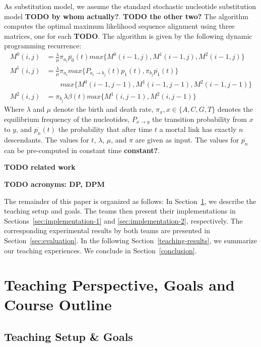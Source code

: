 \documentclass[runningheads,a4paper]{llncs}
\begin{document}
As substitution model, we assume the standard stochastic nucleotide substitution model {\bf TODO by whom actually?}. 
{\bf TODO the other two?} 
The algorithm computes the optimal maximum likelihood sequence alignment using three matrices, one for each {\bf TODO}.
The algorithm is given by the following dynamic programming recurrence: 
\[
\begin{aligned}
  M^0(i,j)&=\frac{\lambda}{\mu}\pi_{a_i}\overline{p_0}(t)max\{M^0(i-1, j), M^1(i-1,j), M^2(i-1,j)\}\\
  M^1(i,j)&=\frac{\lambda}{\mu}\pi_{a_i}max\{P_{a_i \rightarrow b_j}(t) p_1(t), \pi_{b_j}\overline{p_1}(t)\}\\
          &\quad\quad max\{M^0(i-1, j-1), M^1(i-1,j-1), M^2(i-1,j-1)\}\\
  M^2(i,j)&=\pi_{b_j}\lambda\beta(t)max\{M^1(i,j-1), M^2(i,j-1)\}
\end{aligned}
\]
Where $\lambda$ and $\mu$ denote the birth and death rate, $\pi_x, x \in \{A,C,G,T\}$ denotes the equilibrium frequency of the nucleotides, 
$P_{x \rightarrow y}$ the transition probability from $x$ to $y$, and $\overline{p_n}(t)$ the probability that after time $t$ a mortal link has exactly $n$ descendants. 
The values for $t$, $\lambda$, $\mu$, and $\pi$ are given as input. 
The values for $\overline{p_n}$ can be pre-computed in constant time {\bf constant?}.

{\bf TODO related work} 

{\bf TODO acronyms: DP, DPM} 

The remainder of this paper is organized as follows: In Section~\ref{teaching}, we describe the teaching setup and goals. 
The teams then present their implementations in Sections~\ref{sec:implementation-1} and \ref{sec:implementation-2}, respectively. 
The corresponding experimental results by both teams are presented in Section~\ref{sec:evaluation}.
In the following Section~\ref{teaching-results}, we summarize our teaching experiences.
We conclude in Section~\ref{conclusion}.

\section{Teaching Perspective, Goals and Course Outline}
\label{teaching} 

\subsection{Teaching Setup \& Goals} 
\end{document}
